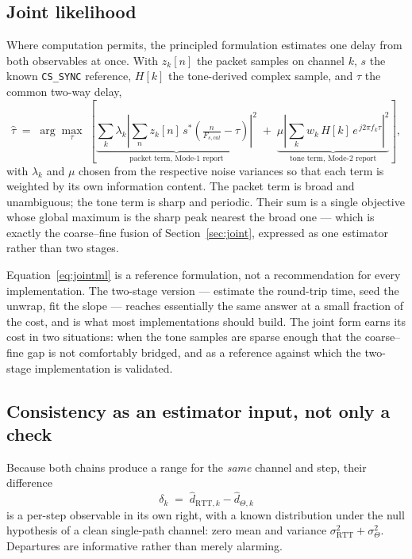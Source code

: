 \documentclass[11pt,a4paper]{article}
\newcommand{\RTT}{\mathrm{RTT}}
\newcommand{\code}[1]{\texttt{\small #1}}
\begin{document}
\subsection{Joint likelihood}

Where computation permits, the principled formulation estimates one delay from both observables at
once. With $z_k[n]$ the packet samples on channel $k$, $s$ the known \code{CS\_SYNC} reference,
$H[k]$ the tone-derived complex sample, and $\tau$ the common two-way delay,
\begin{equation}
\hat\tau \;=\; \arg\max_{\tau}\;
\left[
  \underbrace{\sum_{k} \lambda_k \left| \sum_n z_k[n]\,s^{*}\!\left(\tfrac{n}{F_{s,cal}}-\tau\right)\right|^2}_{\text{packet term, Mode-1 report}}
  \;+\;
  \underbrace{\mu \left| \sum_k w_k\, H[k]\, e^{\,j 2\pi f_k \tau}\right|^2}_{\text{tone term, Mode-2 report}}
\right],
\label{eq:jointml}
\end{equation}
with $\lambda_k$ and $\mu$ chosen from the respective noise variances so that each term is weighted
by its own information content. The packet term is broad and unambiguous; the tone term is sharp and
periodic. Their sum is a single objective whose global maximum is the sharp peak nearest the broad
one --- which is exactly the coarse--fine fusion of Section~\ref{sec:joint}, expressed as one
estimator rather than two stages.

Equation~\eqref{eq:jointml} is a reference formulation, not a recommendation for every
implementation. The two-stage version --- estimate the round-trip time, seed the unwrap, fit the
slope --- reaches essentially the same answer at a small fraction of the cost, and is what most
implementations should build. The joint form earns its cost in two situations: when the tone samples
are sparse enough that the coarse--fine gap is not comfortably bridged, and as a reference against
which the two-stage implementation is validated.

\subsection{Consistency as an estimator input, not only a check}

Because both chains produce a range for the \emph{same} channel and step, their difference
\begin{equation}
\delta_k \;=\; \hat d_{\RTT,k} - \hat d_{\Theta,k}
\label{eq:consistency}
\end{equation}
is a per-step observable in its own right, with a known distribution under the null hypothesis of a
clean single-path channel: zero mean and variance $\sigma_{\RTT}^2 + \sigma_{\Theta}^2$. Departures
are informative rather than merely alarming.
\end{document}
